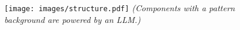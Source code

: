 \begin{figure}[t]
\centering
\texttt{[image: images/structure.pdf]}
{\textit{(Components with a pattern background are powered
by an LLM.)}
}

\vspace{-0.15in}
\end{figure}
